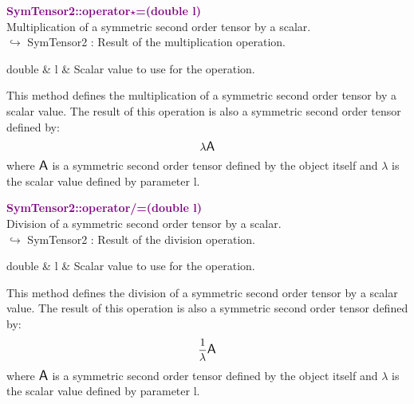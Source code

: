 \textcolor{purple}{\textbf{SymTensor2::operator$\star$=(double l)}}\label{SymTensor2::operator*=(double l)}\\
Multiplication of a symmetric second order tensor by a scalar.\\ \hspace*{10mm}$\hookrightarrow$ SymTensor2 : Result of the multiplication operation.

\begin{tcolorbox}[width=\textwidth,myArgs,tabularx={ll|R}]
double & l & Scalar value to use for the operation.
\end{tcolorbox}

This method defines the multiplication of a symmetric second order tensor by a scalar value.
The result of this operation is also a symmetric second order tensor defined by:
\begin{equation*}
\lambda \mbox{\large\ensuremath{\mathsf{A}}}
\end{equation*}
where $\mbox{\large\ensuremath{\mathsf{A}}}$ is a symmetric second order tensor defined by the object itself and $\lambda$ is the scalar value defined by parameter l.

\textcolor{purple}{\textbf{SymTensor2::operator/=(double l)}}\label{SymTensor2::operator/=(double l)}\\
Division of a symmetric second order tensor by a scalar.\\ \hspace*{10mm}$\hookrightarrow$ SymTensor2 : Result of the division operation.

\begin{tcolorbox}[width=\textwidth,myArgs,tabularx={ll|R}]
double & l & Scalar value to use for the operation.
\end{tcolorbox}

This method defines the division of a symmetric second order tensor by a scalar value.
The result of this operation is also a symmetric second order tensor defined by:
\begin{equation*}
\frac{1}{\lambda} \mbox{\large\ensuremath{\mathsf{A}}}
\end{equation*}
where $\mbox{\large\ensuremath{\mathsf{A}}}$ is a symmetric second order tensor defined by the object itself and $\lambda$ is the scalar value defined by parameter l.


